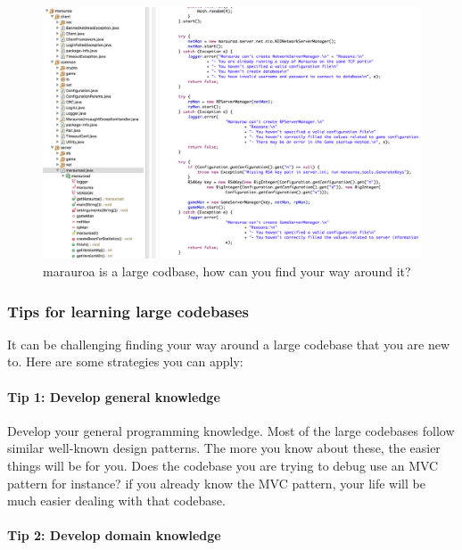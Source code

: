 \documentclass[
]{book}
\begin{document}
\begin{figure}

{\centering \includegraphics[width=1\linewidth]{images/marauroa} 

}

\caption{marauroa is a large codbase, how can you find your way around it?}\label{fig:marauroa-fig}
\end{figure}

\hypertarget{tips}{%
\subsubsection{Tips for learning large codebases}\label{tips}}

It can be challenging finding your way around a large codebase that you are new to. Here are some strategies you can apply:

\hypertarget{tip1}{%
\paragraph{Tip 1: Develop general knowledge}\label{tip1}}

Develop your general programming knowledge. Most of the large codebases follow similar well-known design patterns. The more you know about these, the easier things will be for you. Does the codebase you are trying to debug use an MVC pattern for instance? if you already know the MVC pattern, your life will be much easier dealing with that codebase.

\hypertarget{tip2}{%
\paragraph{Tip 2: Develop domain knowledge}\label{tip2}}
\end{document}
